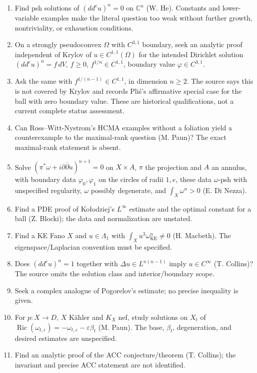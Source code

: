 \documentclass[11pt]{article}
\newcommand{\C}{\mathbb{C}}
\begin{document}
\begin{enumerate}
\item Find psh solutions of \((dd^cu)^n=0\) on \(\C^n\) (W. He). Constants and lower-variable examples make the literal question too weak without further growth, nontriviality, or exhaustion conditions.
\item On a strongly pseudoconvex \(\Omega\) with \(C^{3,1}\) boundary, seek an analytic proof independent of Krylov of \(u\in C^{1,1}(\Omega)\) for the intended Dirichlet solution \((dd^cu)^n=f\,dV\), \(f\geq0\), \(f^{1/n}\in C^{1,1}\), boundary value \(\varphi\in C^{3,1}\).
\item Ask the same with \(f^{1/(n-1)}\in C^{1,1}\), in dimension \(n\geq2\). The source says this is not covered by Krylov and records Pli\'s's affirmative special case for the ball with zero boundary value. These are historical qualifications, not a current complete status assessment.
\item Can Ross--Witt-Nystrom's HCMA examples without a foliation yield a counterexample to the maximal-rank question (M. Paun)? The exact maximal-rank statement is absent.
\item Solve \((\pi^*\omega+i\partial\overline\partial u)^{n+1}=0\) on \(X\times A\), \(\pi\) the projection and \(A\) an annulus, with boundary data \(\varphi_0,\varphi_1\) on the circles of radii \(1,e\), these data \(\omega\)-psh with unspecified regularity, \(\omega\) possibly degenerate, and \(\int_X\omega^n>0\) (E. Di Nezza).
\item Find a PDE proof of Ko\l odziej's \(L^\infty\) estimate and the optimal constant for a ball (Z. Blocki); the data and normalization are unstated.
\item Find a KE Fano \(X\) and \(u\in\Lambda_1\) with \(\int_Xu^3\omega_{\mathrm{KE}}^n\ne0\) (H. Macbeth). The eigenspace/Laplacian convention must be specified.
\item Does \((dd^cu)^n=1\) together with \(\Delta u\in L^{n(n-1)}\) imply \(u\in C^\infty\) (T. Collins)? The source omits the solution class and interior/boundary scope.
\item Seek a complex analogue of Pogorelov's estimate; no precise inequality is given.
\item For \(p:X\to D\), \(X\) K\"ahler and \(K_X\) nef, study solutions on \(X_t\) of \(\operatorname{Ric}(\omega_{t,\varepsilon})=-\omega_{t,\varepsilon}-\varepsilon\beta_t\) (M. Paun). The base, \(\beta_t\), degeneration, and desired estimates are unspecified.
\item Find an analytic proof of the ACC conjecture/theorem (T. Collins); the invariant and precise ACC statement are not identified.
\end{enumerate}
\end{document}
